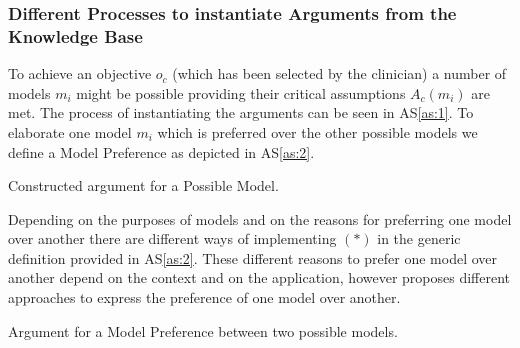 \subsubsection*{Different Processes to instantiate Arguments from the Knowledge Base}

To achieve an objective $o_c$ (which has been selected by the clinician) a number of models $m_i$ might be possible providing their critical assumptions $A_c(m_i)$ are met. The process of instantiating the arguments can be seen in AS\autoref{as:1}. To elaborate one model $m_i$ which is preferred over the other possible models we define a Model Preference as depicted in AS\ref{as:2}.

\begin{AS}[h]
\centering
	\caption{Constructed argument for a Possible Model.\label{as:1}}
\end{AS}

Depending on the purposes of models and on the reasons for preferring one model over another there are different ways of implementing $(\ast)$ in the generic definition provided in AS\ref{as:2}. These different reasons to prefer one model over another depend on the context and on the application, however \cite{sassoon2014} proposes different approaches to express the preference of one model over another.  

\begin{AS}[h]
\centering
	\caption{Argument for a Model Preference between two possible models.\label{as:2}}

\end{AS}

